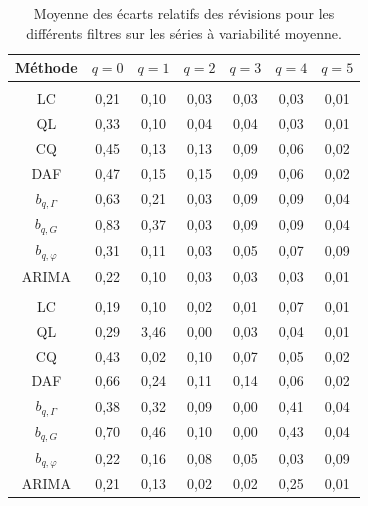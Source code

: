 \documentclass[
  12pt,
  french,
  12pt,a4paper]{article}
\newcommand\1{\mathds{1}}
\begin{document}
\begin{table}[!h]

\caption{\label{tab:simulrev}Moyenne des écarts relatifs des révisions pour les différents filtres sur les séries à variabilité moyenne.}
\centering
\begin{tabular}[t]{ccccccc}
\toprule
Méthode & $q=0$ & $q=1$ & $q=2$ & $q=3$ & $q=4$ & $q=5$\\
\midrule
\addlinespace[0.3em]
\multicolumn{7}{l}{\textbf{$MAE_{fe}(q) = \mathbb E\left[\left|(y_{t|t+q} -  y_{t|last})/y_{t|last}\right|\right]$}}\\
\hspace{1em}LC & 0,21 & 0,10 & 0,03 & 0,03 & 0,03 & 0,01\\
\hspace{1em}QL & 0,33 & 0,10 & 0,04 & 0,04 & 0,03 & 0,01\\
\hspace{1em}CQ & 0,45 & 0,13 & 0,13 & 0,09 & 0,06 & 0,02\\
\hspace{1em}DAF & 0,47 & 0,15 & 0,15 & 0,09 & 0,06 & 0,02\\
\hspace{1em}$b_{q,\Gamma}$ & 0,63 & 0,21 & 0,03 & 0,09 & 0,09 & 0,04\\
\hspace{1em}$b_{q,G}$ & 0,83 & 0,37 & 0,03 & 0,09 & 0,09 & 0,04\\
\hspace{1em}$b_{q,\varphi}$ & 0,31 & 0,11 & 0,03 & 0,05 & 0,07 & 0,09\\
\hspace{1em}ARIMA & 0,22 & 0,10 & 0,03 & 0,03 & 0,03 & 0,01\\
\addlinespace[0.3em]
\multicolumn{7}{l}{\textbf{$MAE_{ce}(q)=\mathbb E\left[
\left|(y_{t|t+q} - y_{t|t+q+1})/y_{t|t+q+1}\right|
\right]$}}\\
\hspace{1em}LC & 0,19 & 0,10 & 0,02 & 0,01 & 0,07 & 0,01\\
\hspace{1em}QL & 0,29 & 3,46 & 0,00 & 0,03 & 0,04 & 0,01\\
\hspace{1em}CQ & 0,43 & 0,02 & 0,10 & 0,07 & 0,05 & 0,02\\
\hspace{1em}DAF & 0,66 & 0,24 & 0,11 & 0,14 & 0,06 & 0,02\\
\hspace{1em}$b_{q,\Gamma}$ & 0,38 & 0,32 & 0,09 & 0,00 & 0,41 & 0,04\\
\hspace{1em}$b_{q,G}$ & 0,70 & 0,46 & 0,10 & 0,00 & 0,43 & 0,04\\
\hspace{1em}$b_{q,\varphi}$ & 0,22 & 0,16 & 0,08 & 0,05 & 0,03 & 0,09\\
\hspace{1em}ARIMA & 0,21 & 0,13 & 0,02 & 0,02 & 0,25 & 0,01\\
\bottomrule
\end{tabular}
\end{table}
\end{document}
